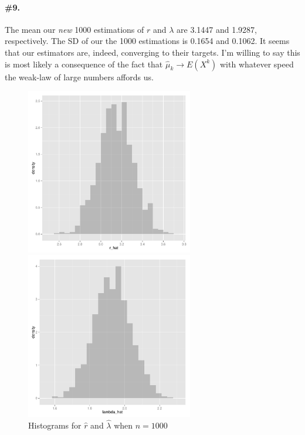 \documentclass{article}\usepackage{graphicx, color}
\newenvironment{knitrout}{}{} %
\begin{document}
\paragraph{\#9.}




The mean our \textit{new} 1000 estimations of $r$ and $\lambda$ are 3.1447 and 1.9287, respectively. The SD of our the 1000 estimations is 0.1654 and 0.1062. It seems that our estimators are, indeed, converging to their targets. I'm willing to say this is most likely a consequence of the fact that $\hat{\mu}_{k} \to E(X^k)$ with whatever speed the weak-law of large numbers affords us.

\begin{figure}[ht!]
\centering
\begin{knitrout}
\color{fgcolor}\includegraphics[width=0.65\textwidth]{figure/prob9Plots} 
\end{knitrout}

\begin{knitrout}
\color{fgcolor}\includegraphics[width=0.65\textwidth]{figure/prob9Plots2} 
\end{knitrout}

\caption{Histograms for $\hat{r}$ and $\hat{\lambda}$ when $n=1000$}
\end{figure}
\end{document}
